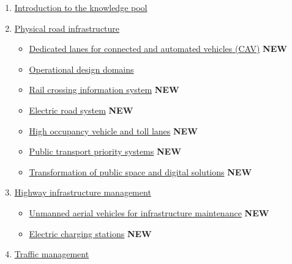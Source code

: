 \documentclass[
]{book}
\providecommand{\tightlist}{%
  \setlength{\itemsep}{0pt}\setlength{\parskip}{0pt}}
\begin{document}
\begin{enumerate}
\def\labelenumi{\arabic{enumi}.}
\tightlist
\item
  \protect\hyperlink{intro}{Introduction to the knowledge pool}
\item
  \protect\hyperlink{infrastructure}{Physical road infrastructure}

  \begin{itemize}
  \tightlist
  \item
    \protect\hyperlink{dedicated_lanes}{Dedicated lanes for connected and automated vehicles (CAV)} \textbf{NEW}
  \item
    \protect\hyperlink{ODD}{Operational design domains}
  \item
    \protect\hyperlink{rail_crossing_info_system}{Rail crossing information system} \textbf{NEW}
  \item
    \protect\hyperlink{ers}{Electric road system} \textbf{NEW}
  \item
    \protect\hyperlink{high_occupancy}{High occupancy vehicle and toll lanes} \textbf{NEW}
  \item
    \protect\hyperlink{public_trans_priority}{Public transport priority systems} \textbf{NEW}
  \item
    \protect\hyperlink{transformation_public_space}{Transformation of public space and digital solutions} \textbf{NEW}
  \end{itemize}
\item
  \protect\hyperlink{highway}{Highway infrastructure management}

  \begin{itemize}
  \tightlist
  \item
    \protect\hyperlink{uav}{Unmanned aerial vehicles for infrastructure maintenance} \textbf{NEW}
  \item
    \protect\hyperlink{charging_station}{Electric charging stations} \textbf{NEW}
  \end{itemize}
\item
  \protect\hyperlink{traffic}{Traffic management}


\end{enumerate}
\end{document}
